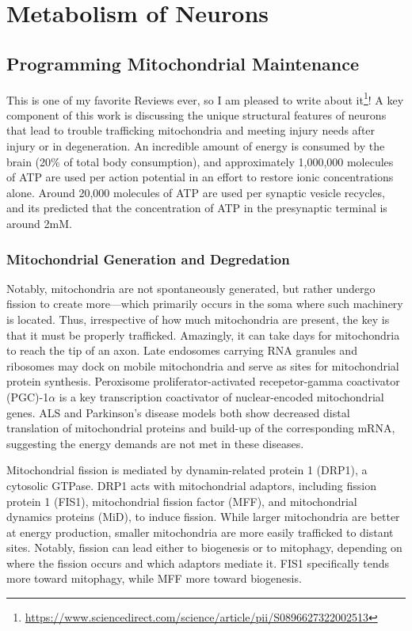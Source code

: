 \documentclass[12pt]{report}
\begin{document}
\chapter{Metabolism of Neurons}

\section{Programming Mitochondrial Maintenance}

This is one of my favorite Reviews ever, so I am pleased to write about it\footnote{\url{https://www.sciencedirect.com/science/article/pii/S0896627322002513}}! A key component of this work is discussing the unique structural features of neurons that lead to trouble trafficking mitochondria and meeting injury needs after injury or in degeneration. An incredible amount of energy is consumed by the brain (20\% of total body consumption), and approximately 1,000,000 molecules of ATP are used per action potential in an effort to restore ionic concentrations alone. Around 20,000 molecules of ATP are used per synaptic vesicle recycles, and its predicted that the concentration of ATP in the presynaptic terminal is around 2mM.

\subsection{Mitochondrial Generation and Degredation}

Notably, mitochondria are not spontaneously generated, but rather undergo fission to create more---which primarily occurs in the soma where such machinery is located. Thus, irrespective of how much mitochondria are present, the key is that it must be properly trafficked. Amazingly, it can take days for mitochondria to reach the tip of an axon. Late endosomes carrying RNA granules and ribosomes may dock on mobile mitochondria and serve as sites for mitochondrial protein synthesis. Peroxisome proliferator-activated recepetor-gamma coactivator (PGC)-1$\alpha$ is a key transcription coactivator of nuclear-encoded mitochondrial genes. ALS and Parkinson's disease models both show decreased distal translation of mitochondrial proteins and build-up of the corresponding mRNA, suggesting the energy demands are not met in these diseases.\newline

Mitochondrial fission is mediated by dynamin-related protein 1 (DRP1), a cytosolic GTPase. DRP1 acts with mitochondrial adaptors, including fission protein 1 (FIS1), mitochondrial fission factor (MFF), and mitochondrial dynamics proteins (MiD), to induce fission. While larger mitochondria are better at energy production, smaller mitochondria are more easily trafficked to distant sites. Notably, fission can lead either to biogenesis or to mitophagy, depending on where the fission occurs and which adaptors mediate it. FIS1 specifically tends more toward mitophagy, while MFF more toward biogenesis.\newline
\end{document}
